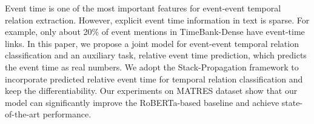 Event time is one of the most important features for event-event temporal relation extraction. However, explicit event time information in text is sparse. For example, only about 20\% of event mentions in TimeBank-Dense have event-time links. In this paper, we propose a joint model for event-event temporal relation classification and an auxiliary task, relative event time prediction, which predicts the event time as real numbers. We adopt the Stack-Propagation framework to incorporate predicted relative event time for temporal relation classification and keep the differentiability. Our experiments on MATRES dataset show that our model can significantly improve the RoBERTa-based baseline and achieve state-of-the-art performance.
